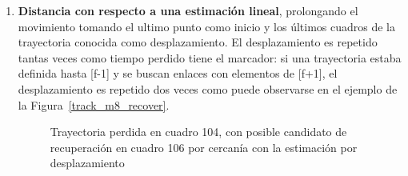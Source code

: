 \begin{itemize}
\begin{enumerate}
  \item \textbf{Distancia con respecto a una estimación lineal}, prolongando el movimiento tomando el ultimo punto como inicio y los últimos cuadros de la trayectoria conocida como desplazamiento. El desplazamiento es repetido tantas veces como tiempo perdido tiene el marcador: si una trayectoria estaba definida hasta [f-1] y se buscan enlaces con elementos de [f+1], el desplazamiento es repetido dos veces como puede observarse en el ejemplo de la Figura~\ref{track_m8_recover}. 
 
\begin{figure}[ht!]
 \centering
  \hspace{3 mm}
	
\caption{Trayectoria perdida en cuadro 104, con posible candidato de recuperación en cuadro 106 por cercanía con la estimación por desplazamiento}
\label{inventario_trayectoria_direccional}
\end{figure} 
  

\end{enumerate}
\end{itemize}
